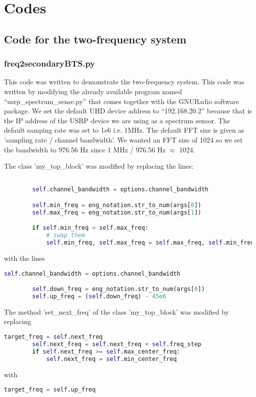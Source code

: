 \chapter{Codes}

\section{Code for the two-frequency system}


\subsection{freq2secondaryBTS.py}

This code was written to demonstrate the two-frequency system.
This code was written by modifying the already available program named 
``usrp\_spectrum\_sense.py'' that comes together with the GNURadio software
package. We set the 
default UHD device address to ``192.168.20.2'' because that is the IP address
of the USRP device we are using as a spectrum sensor. The default samping rate
was set to 1e6 i.e. 1MHz. The default FFT size is given as 'sampling rate /
channel bandwidth'. We wanted an FFT size of 1024 so we set the bandwidth to
976.56 Hz since 1 MHz / 976.56 Hz $\approx$ 1024.

The class 'my\_top\_block' was modified by replacing the lines:
\begin{lstlisting}[language=Python]

        self.channel_bandwidth = options.channel_bandwidth

        self.min_freq = eng_notation.str_to_num(args[0])
        self.max_freq = eng_notation.str_to_num(args[1])

        if self.min_freq > self.max_freq:
            # swap them
            self.min_freq, self.max_freq = self.max_freq, self.min_freq    
\end{lstlisting}
with the lines
\begin{lstlisting}[language=Python]
        self.channel_bandwidth = options.channel_bandwidth

        self.down_freq = eng_notation.str_to_num(args[0])
        self.up_freq = (self.down_freq) - 45e6    
\end{lstlisting}

The method 'set\_next\_freq' of the class 'my\_top\_block' was modified by
replacing
\begin{lstlisting}[language=Python]
        target_freq = self.next_freq
        self.next_freq = self.next_freq + self.freq_step
        if self.next_freq >= self.max_center_freq:
            self.next_freq = self.min_center_freq
\end{lstlisting}
with
\begin{lstlisting}[language=Python]
        target_freq = self.up_freq
\end{lstlisting}




